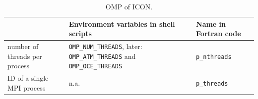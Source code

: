 \documentclass[a4paper,11pt,DIV16,BCOR1cm,titlepage]{scrartcl}
\begin{document}
\begin{table}[htb]
\renewcommand{\arraystretch}{1.4}
\begin{center}
\begin{tabular}{|p{5cm}|p{7 cm}|p{3cm}|}
\hline
\textbf{ }  & \textbf{Environment variables in shell scripts}  & \textbf{Name in Fortran code} \\ 
\hline\hline
number of threads per process & \texttt{OMP\_NUM\_THREADS}, later: \texttt{OMP\_ATM\_THREADS} and \texttt{OMP\_OCE\_THREADS} & \texttt{p\_nthreads} \\ 
ID of a single MPI process     & n.a. & \texttt{p\_threads} \\ 
\hline
\end{tabular}
\caption{OMP of ICON.}\label{tbl_OMP}
\end{center}
\end{table}
\end{document}
